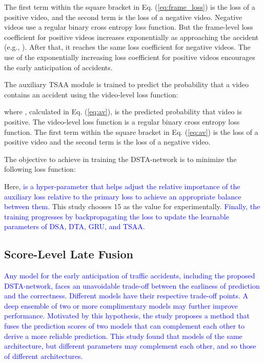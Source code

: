 \documentclass[journal]{IEEEtran}
\begin{document}
The first term within the square bracket in Eq. (\ref{eq:frame_loss})  is the loss of a positive video, and the second term is the loss of a negative video. Negative videos use a regular binary cross entropy loss function. But the frame-level loss coefficient for positive videos increases exponentially as approaching the accident (e.g., ). After that, it reaches the same loss coefficient for negative videos. The use of the exponentially increasing loss coefficient for positive videos encourages the early anticipation of accidents.

The auxiliary TSAA module is trained to predict the probability that a video contains an accident using the video-level loss function:

where , calculated in Eq. (\ref{eq:av}), is the predicted probability that video  is positive. The video-level loss function is a regular binary cross entropy loss function. The first term within the square bracket in Eq. (\ref{eq:av}) is the loss of a positive video and the second term is the loss of a negative video. 

The objective to achieve in training the DSTA-network is to minimize the following loss function:

Here,  \textcolor{blue}{is a hyper-parameter that helps adjust the relative importance of the auxiliary loss  relative to the primary loss  to achieve an appropriate balance between them.} This study chooses 15 as the value for  experimentally. \textcolor{blue}{Finally, the training progresses by backpropagating the loss  to update the learnable parameters of DSA, DTA, GRU, and TSAA.}


\subsection{Score-Level Late Fusion}
\label{subsec_fusion}

\textcolor{blue}{Any model for the early anticipation of traffic accidents, including the proposed DSTA-network, faces an unavoidable trade-off between the earliness of prediction and the correctness. Different models have their respective trade-off points. A deep ensemble of two or more complimentary models may further improve performance. Motivated by this hypothesis, the study proposes a method that fuses the prediction scores of two models that can complement each other to derive a more reliable prediction. This study found that models of the same architecture, but different parameters may complement each other, and so those of different architectures.}
\end{document}
